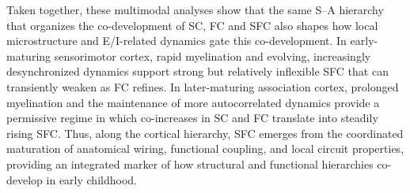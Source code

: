Taken together, these multimodal analyses show that the same S--A hierarchy that organizes the co-development of SC, FC and SFC also shapes how local microstructure and E/I-related dynamics gate this co-development. In early-maturing sensorimotor cortex, rapid myelination and evolving, increasingly desynchronized dynamics support strong but relatively inflexible SFC that can transiently weaken as FC refines. In later-maturing association cortex, prolonged myelination and the maintenance of more autocorrelated dynamics provide a permissive regime in which co-increases in SC and FC translate into steadily rising SFC. Thus, along the cortical hierarchy, SFC emerges from the coordinated maturation of anatomical wiring, functional coupling, and local circuit properties, providing an integrated marker of how structural and functional hierarchies co-develop in early childhood.
